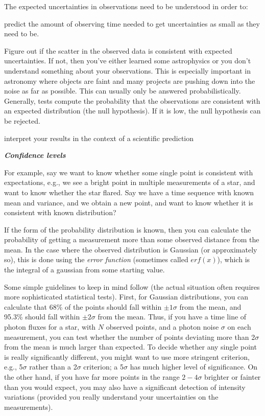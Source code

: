 \documentclass[12pt]{article}
\begin{document}
The expected uncertainties in observations need to be understood in
order to:
\begin{itemize*}
    \item predict the amount of observing time needed to get
        uncertainties as small as they need to be.
    \item Figure out if the scatter in the observed data is consistent
        with expected uncertainties. If not, then
        you've either learned some astrophysics or you don't understand
        something about your observations. This is especially important in
        astronomy where objects are faint and many projects are pushing
        down into the noise as far as possible. This can usually only
        be answered probabilistically. Generally, tests compute the
        probability that the observations are consistent with an expected
        distribution (the null hypothesis). If it is low, the null
        hypothesis can be rejected.
    \item interpret your results in the context of a scientific prediction
\end{itemize*}

\textbf{\emph{Confidence levels}}

For example, say we want to know whether some single point
is consistent with expectations, e.g., we see a bright point in
multiple measurements of a star, and want to know whether the star
flared. Say we have a time sequence with known mean and variance, and
we obtain a new point, and want to know whether it is consistent with
known distribution?

If the form of the probability distribution is known, then
you can calculate the probability of getting a measurement more than
some observed distance from the mean. In the case where the observed
distribution is Gaussian (or approximately so), this is done using the
\emph{error function} (sometimes called $erf(x)$), which is the integral of a
gaussian from some starting value.

Some simple guidelines to keep in mind follow (the actual
situation often requires more sophisticated statistical tests). First,
for Gaussian distributions, you can calculate that 68\% of the points
should fall within $\pm 1\sigma$ from the mean, and 95.3\%
should fall within $\pm 2\sigma$ from the mean. Thus, if you have a
time line of photon fluxes for a star, with $N$ observed points, and a
photon noise $\sigma$ on each measurement, you can test whether the
number of points deviating more than 2$\sigma$ from the mean is much
larger than expected. To decide whether any single point is really
significantly different, you might want to use more stringent
criterion, e.g., 5$\sigma$ rather than a 2$\sigma$ criterion;
a 5$\sigma$ has much higher level of significance. On the other hand, if
you have far more points in the range $2-4\sigma$ brighter or
fainter than you would expect, you may also have a significant
detection of intensity variations (provided you really understand your
uncertainties on the measurements).
\end{document}
